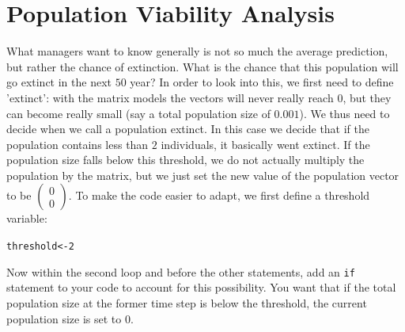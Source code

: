 \documentclass{article}\usepackage[]{graphicx}\usepackage[]{color}
\makeatletter
\newcommand{\hlnum}[1]{\textcolor[rgb]{0.686,0.059,0.569}{#1}}%
\newcommand{\hlstd}[1]{\textcolor[rgb]{0.345,0.345,0.345}{#1}}%
\newcommand{\hlkwb}[1]{\textcolor[rgb]{0.69,0.353,0.396}{#1}}%
\newenvironment{kframe}{%
 \def\at@end@of@kframe{}%
 \ifinner\ifhmode%
  \def\at@end@of@kframe{\end{minipage}}%
  \begin{minipage}{\columnwidth}%
 \fi\fi%
 \def\FrameCommand##1{\hskip\@totalleftmargin \hskip-\fboxsep
 \colorbox{shadecolor}{##1}\hskip-\fboxsep
     \hskip-\linewidth \hskip-\@totalleftmargin \hskip\columnwidth}%
 \MakeFramed {\advance\hsize-\width
   \@totalleftmargin\z@ \linewidth\hsize
   \@setminipage}}%
 {\par\unskip\endMakeFramed%
 \at@end@of@kframe}
\newenvironment{knitrout}{}{} %
\makeatother
\begin{document}
\section{Population Viability Analysis}
What managers want to know generally is not so much the average prediction, but rather the chance of extinction. What is the chance that this population will go extinct in the next $50$ year? In order to look into this, we first need to define 'extinct': with the matrix models the vectors will never really reach $0$, but they can become really small (say a total population size of $0.001$). We thus need to decide when we call a population extinct. In this case we decide that if the population contains less than $2$ individuals, it basically went extinct. If the population size falls below this threshold, we do not actually multiply the population by the matrix, but we just set the new value of the population vector to be $\begin{pmatrix} 0 \\ 0 \end{pmatrix}$. To make the code easier to adapt, we first define a threshold variable:
\begin{knitrout}
\color{fgcolor}\begin{kframe}
\begin{alltt}
\hlstd{threshold}\hlkwb{<-}\hlnum{2}
\end{alltt}
\end{kframe}
\end{knitrout}
Now within the second loop and before the other statements, add an \texttt{if} statement to your code to account for this possibility. You want that if the total population size at the former time step is below the threshold, the current population size is set to $0$. 
\end{document}
